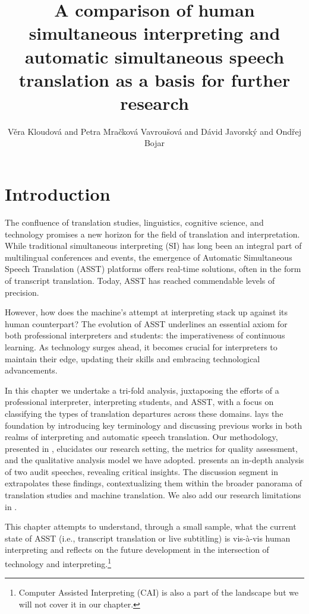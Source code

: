 \documentclass[output=paper]{langscibook}
\author{Věra Kloudová\affiliation{Charles University} and Petra Mračková Vavroušová\affiliation{Charles University} and Dávid Javorský\affiliation{Charles University} and Ondřej Bojar\affiliation{Charles University}}
\title[{Human} and automatic {simultaneous} {interpreting}/{speech} {translation}]{{A} {comparison} {of} {human} {simultaneous} {interpreting} {and} {automatic} {simultaneous} {speech} {translation} {as} {a} {basis} {for} {further} {research}}
\begin{document}
\maketitle

\section{Introduction}\label{sec:kloudova:1}

The confluence of translation studies, linguistics, cognitive science, and technology promises a new horizon for the field of translation and interpretation. While traditional simultaneous interpreting (SI) has long been an integral part of multilingual conferences and events, the emergence of Automatic Simultaneous Speech Translation (ASST) platforms offers real-time solutions, often in the form of transcript translation. Today, ASST has reached commendable levels of precision.

However, how does the machine’s attempt at interpreting stack up against its human counterpart? The evolution of ASST underlines an essential axiom for both professional interpreters and students: the imperativeness of continuous learning. As technology surges ahead, it becomes crucial for interpreters to maintain their edge, updating their skills and embracing technological advancements.

In this chapter we undertake a tri-fold analysis, juxtaposing the efforts of a professional interpreter, interpreting students, and ASST, with a focus on classifying the types of translation departures across these domains.  lays the foundation by introducing key terminology and discussing previous works in both realms of interpreting and automatic speech translation. Our methodology, presented in , elucidates our research setting, the metrics for quality assessment, and the qualitative analysis model we have adopted.  presents an in-depth analysis of two audit speeches, revealing critical insights. The discussion segment in  extrapolates these findings, contextualizing them within the broader panorama of translation studies and machine translation. We also add our research limitations in .

This chapter attempts to understand, through a small sample, what the current state of ASST (i.e., transcript translation or live subtitling) is vis-à-vis human interpreting and reflects on the future development in the intersection of technology and interpreting.\footnote{{Computer Assisted Interpreting (CAI) is also a part of the landscape but we will not cover it in our chapter.}}
\end{document}
